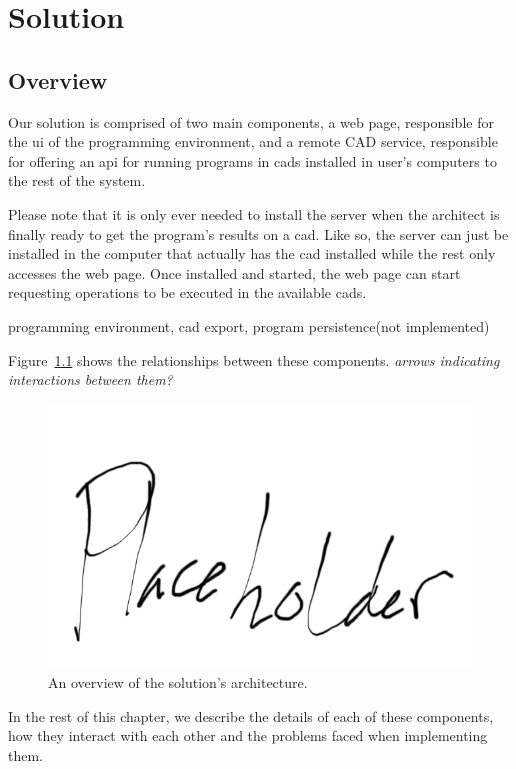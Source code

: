 
\chapter{Solution}
\label{chapter:solution}


\section{Overview}
Our solution is comprised of two main components, a web page, responsible for the \gls{ui} of the programming environment, and a remote CAD service, responsible for offering an \gls{api} for running programs in \glspl{cad} installed in user's computers to the rest of the system.

Please note that it is only ever needed to install the server when the architect is finally ready to get the program's results on a \gls{cad}.
Like so, the server can just be installed in the computer that actually has the \gls{cad} installed while the rest only accesses the web page.
Once installed and started, the web page can start requesting operations to be executed in the available \glspl{cad}.

programming environment, cad export, program persistence(not implemented)

Figure~\ref{fig:arch:overview} shows the relationships between these components. {\it arrows indicating interactions between them?}

\begin{figure}
  \centering
  \includegraphics[width=12cm]{./images/architecture_overview}
  \caption{An overview of the solution's architecture.}
  \label{fig:arch:overview}
\end{figure}

In the rest of this chapter, we describe the details of each of these components, how they interact with each other and the problems faced when implementing them.


